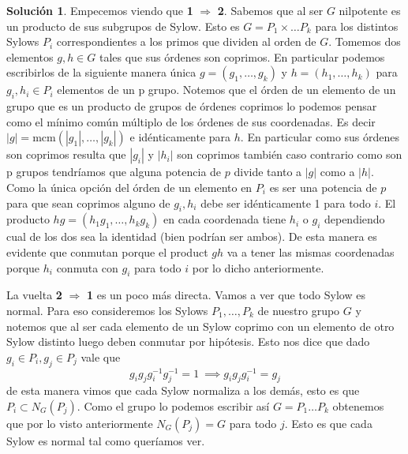 \documentclass[11pt]{article}
\theoremstyle{plain}
\theoremstyle{definition}
\newtheorem*{sol}{Solución}
\theoremstyle{remark}
\begin{document}
\begin{sol}
	Empecemos viendo que \textbf{1} $\Rightarrow$ \textbf{2}. Sabemos que al ser $G$ nilpotente es un producto de sus subgrupos de Sylow. Esto es $G = P_1 \times \dots P_k$ para los distintos Sylows $P_i$ correspondientes a los primos que dividen al orden de $G$. Tomemos dos elementos $g,h \in G$ tales que sus órdenes son coprimos. En particular podemos escribirlos de la siguiente manera única $g=(g_1, \dots, g_k)$ y $h=(h_1, \dots, h_k)$ para $g_i,h_i \in P_i$ elementos de un p grupo. Notemos que el órden de un elemento de un grupo que es un producto de grupos de órdenes coprimos lo podemos pensar como el mínimo común múltiplo de los órdenes de sus coordenadas. Es decir $|g|= \text{mcm}(|g_1|,\dots, |g_k|)$ e idénticamente para $h$. En particular como sus órdenes son coprimos resulta que $|g_i|$ y $|h_i|$ son coprimos también caso contrario como son p grupos tendríamos que alguna potencia de $p$ divide tanto a $|g|$ como a $|h|$. Como la única opción del órden de un elemento en $P_i$ es ser una potencia de $p$ para que sean coprimos alguno de $g_i,h_i$ debe ser idénticamente 1 para todo $i$. El producto $hg=(h_1g_1, \dots, h_kg_k)$ en cada coordenada tiene $h_i$ o $g_i$ dependiendo cual de los dos sea la identidad (bien podrían ser ambos). De esta manera es evidente que conmutan porque el product $gh$ va a tener las mismas coordenadas porque $h_i$ conmuta con $g_i$ para todo $i$ por lo dicho anteriormente.
	
	La vuelta \textbf{2} $\Rightarrow$ \textbf{1} es un poco más directa. Vamos a ver que todo Sylow es normal. Para eso consideremos los Sylows $P_1, \dots, P_k$ de nuestro grupo $G$ y notemos que al ser cada elemento de un Sylow coprimo con un elemento de otro Sylow distinto luego deben conmutar por hipótesis. Esto nos dice que dado $g_i \in P_i, g_j \in P_j$ vale que
	\[
	g_ig_jg_i^{-1}g_j^{-1} = 1 \ \implies g_ig_jg_i^{-1} = g_j
	\]
	de esta manera vimos que cada Sylow normaliza a los demás, esto es que $P_i \subset N_G(P_j)$. Como el grupo lo podemos escribir así $G=P_1\dots P_k$ obtenemos que por lo visto anteriormente $N_G(P_j)=G$ para todo $j$. Esto es que cada Sylow es normal tal como queríamos ver. 
	
	

\end{sol}
\end{document}
